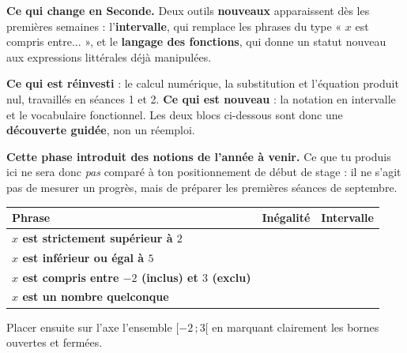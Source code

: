 \documentclass[10pt,a4paper]{article}
\begin{document}
\begin{methodbox}
\textbf{Ce qui change en Seconde.} Deux outils \textbf{nouveaux} apparaissent dès les premières semaines :
l'\textbf{intervalle}, qui remplace les phrases du type « $x$ est compris entre... », et le \textbf{langage
des fonctions}, qui donne un statut nouveau aux expressions littérales déjà manipulées.
\par\smallskip
\textbf{Ce qui est réinvesti} : le calcul numérique, la substitution et l'équation produit nul, travaillés
en séances 1 et 2. \textbf{Ce qui est nouveau} : la notation en intervalle et le vocabulaire fonctionnel.
Les deux blocs ci-dessous sont donc une \textbf{découverte guidée}, non un réemploi.
\end{methodbox}
\begin{warningbox}\small
\textbf{Cette phase introduit des notions de l'année à venir.} Ce que tu produis ici ne sera donc
\emph{pas} comparé à ton positionnement de début de stage : il ne s'agit pas de mesurer un progrès,
mais de préparer les premières séances de septembre.
\end{warningbox}


\par\noindent\begin{tabularx}{\linewidth}{>{\bfseries}p{40mm} X X}
\toprule
Phrase & Inégalité & Intervalle \\
\midrule
$x$ est strictement supérieur à $2$ & & \\
$x$ est inférieur ou égal à $5$ & & \\
$x$ est compris entre $-2$ (inclus) et $3$ (exclu) & & \\
$x$ est un nombre quelconque & & \\
\bottomrule
\end{tabularx}
\par\vspace{1.5mm}
Placer ensuite sur l'axe l'ensemble $[-2\,;3[$ en marquant clairement les bornes ouvertes et fermées.
\begin{center}
\end{center}
\end{document}
